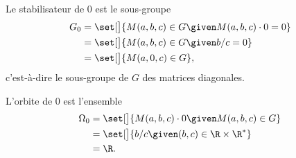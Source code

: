 Le stabilisateur de 0 est le sous-groupe 
%
\begin{align*}
  G_0 
    &= \set[\big]{M(a,b,c)\in G \given M(a,b,c) \cdot 0 = 0 } \\
    &= \set[\big]{M(a,b,c)\in G \given b/c = 0 } \\
    &= \set[\big]{M(a,0,c)\in G},
\end{align*}
%
c'est-à-dire le sous-groupe de $G$ des matrices diagonales.

L'orbite de $0$ est l'ensemble
%
\begin{align*}
  \Omega_0
    &= \set[\big]{ M(a,b,c) \cdot 0 \given M(a,b,c)\in G } \\
    &= \set[\big]{ b/c \given (b,c)\in\R\times\R^*} \\
    &= \R.
\end{align*}

